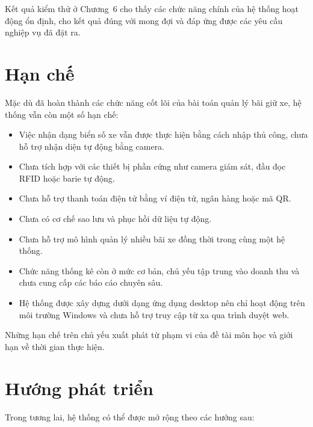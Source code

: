 Kết quả kiểm thử ở Chương~6 cho thấy các chức năng chính của hệ thống
hoạt động ổn định, cho kết quả đúng với mong đợi và đáp ứng được các
yêu cầu nghiệp vụ đã đặt ra.

\section{Hạn chế}

Mặc dù đã hoàn thành các chức năng cốt lõi của bài toán quản lý
bãi giữ xe, hệ thống vẫn còn một số hạn chế:

\begin{itemize}
    \item Việc nhận dạng biển số xe vẫn được thực hiện bằng cách
    nhập thủ công, chưa hỗ trợ nhận diện tự động bằng camera.

    \item Chưa tích hợp với các thiết bị phần cứng như camera giám
    sát, đầu đọc RFID hoặc barie tự động.

    \item Chưa hỗ trợ thanh toán điện tử bằng ví điện tử, ngân hàng
    hoặc mã QR.

    \item Chưa có cơ chế sao lưu và phục hồi dữ liệu tự động.

    \item Chưa hỗ trợ mô hình quản lý nhiều bãi xe đồng thời trong
    cùng một hệ thống.

    \item Chức năng thống kê còn ở mức cơ bản, chủ yếu tập trung vào
    doanh thu và chưa cung cấp các báo cáo chuyên sâu.

    \item Hệ thống được xây dựng dưới dạng ứng dụng desktop nên chỉ
    hoạt động trên môi trường Windows và chưa hỗ trợ truy cập từ xa
    qua trình duyệt web.
\end{itemize}

Những hạn chế trên chủ yếu xuất phát từ phạm vi của đề tài môn học
và giới hạn về thời gian thực hiện.

\section{Hướng phát triển}

Trong tương lai, hệ thống có thể được mở rộng theo các hướng sau:

